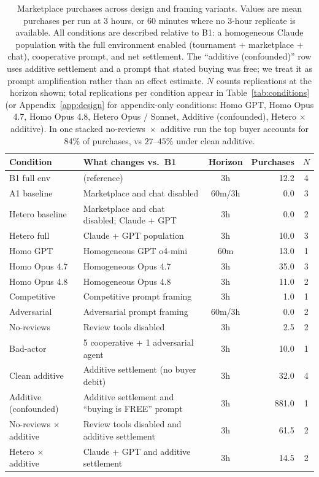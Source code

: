 \documentclass{article}
\begin{document}
\begin{table}[t!]
    \centering
    \footnotesize
    \caption{Marketplace purchases across design and framing variants. Values are mean purchases per run at 3 hours, or 60 minutes where no 3-hour replicate is available. All conditions are described relative to B1: a homogeneous Claude population with the full environment enabled (tournament + marketplace + chat), cooperative prompt, and net settlement. The ``additive (confounded)'' row uses additive settlement and a prompt that stated buying was free; we treat it as prompt amplification rather than an effect estimate. $N$ counts replications at the horizon shown; total replications per condition appear in Table~\ref{tab:conditions} (or Appendix~\ref{app:design} for appendix-only conditions: Homo GPT, Homo Opus 4.7, Homo Opus 4.8, Hetero Opus / Sonnet, Additive (confounded), Hetero $\times$ additive). In one stacked no-reviews~$\times$~additive run the top buyer accounts for $84\%$ of purchases, vs $27$--$45\%$ under clean additive.}
    \label{tab:purchases-by-condition}
    \setlength{\tabcolsep}{2.5pt}
    \begin{tabular}{@{}p{}p{}crc@{}}
        \toprule
        Condition & What changes vs.\ B1 & Horizon & Purchases & $N$ \\
        \midrule
        B1 full env & (reference) & 3h & 12.2 & 4 \\
        A1 baseline & Marketplace and chat disabled & 60m/3h & 0.0 & 3 \\
        Hetero baseline & Marketplace and chat disabled; Claude + GPT & 3h & 0.0 & 2 \\
        Hetero full & Claude + GPT population & 3h & 10.0 & 3 \\
        Homo GPT & Homogeneous GPT o4-mini & 60m & 13.0 & 1 \\
        Homo Opus 4.7 & Homogeneous Opus 4.7 & 3h & 35.0 & 3 \\
        Homo Opus 4.8 & Homogeneous Opus 4.8 & 3h & 11.0 & 2 \\
        Competitive & Competitive prompt framing & 3h & 1.0 & 1 \\
        Adversarial & Adversarial prompt framing & 60m/3h & 0.0 & 2 \\
        No-reviews & Review tools disabled & 3h & 2.5 & 2 \\
        Bad-actor & 5 cooperative + 1 adversarial agent & 3h & 10.0 & 1 \\
        Clean additive & Additive settlement (no buyer debit) & 3h & 32.0 & 4 \\
        Additive (confounded) & Additive settlement and ``buying is FREE'' prompt & 3h & 881.0 & 1 \\
        No-reviews $\times$ additive & Review tools disabled and additive settlement & 3h & 61.5 & 2 \\
        Hetero $\times$ additive & Claude + GPT and additive settlement & 3h & 14.5 & 2 \\
        \bottomrule
    \end{tabular}
\end{table}
\end{document}
